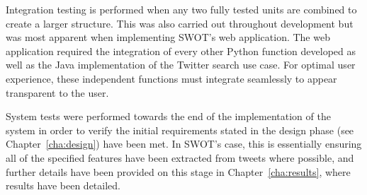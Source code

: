 Integration testing is performed when any two fully tested units are combined to create a larger structure. This was also carried out throughout development but was most apparent when implementing SWOT's web application. The web application required the integration of every other Python function developed as well as the Java implementation of the Twitter search use case. For optimal user experience, these independent functions must integrate seamlessly to appear transparent to the user.

System tests were performed towards the end of the implementation of the system in order to verify the initial requirements stated in the design phase (see Chapter~\ref{cha:design}) have been met. In SWOT's case, this is essentially ensuring all of the specified features have been extracted from tweets where possible, and further details have been provided on this stage in Chapter~\ref{cha:results}, where results have been detailed.

